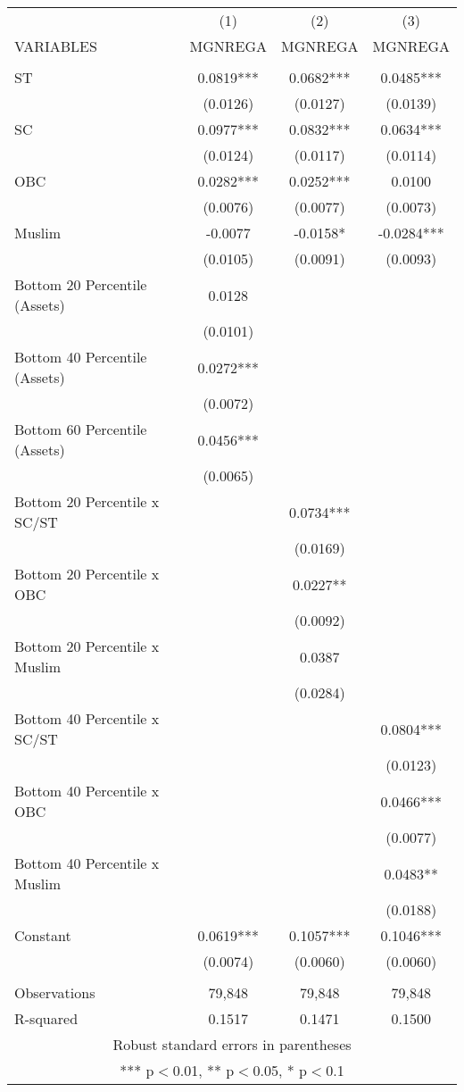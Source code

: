 \documentclass[]{article}
\begin{document}
\begin{tabular}{lccc} \hline
 & (1) & (2) & (3) \\
VARIABLES & MGNREGA & MGNREGA & MGNREGA \\ \hline
 &  &  &  \\
ST & 0.0819*** & 0.0682*** & 0.0485*** \\
 & (0.0126) & (0.0127) & (0.0139) \\
SC & 0.0977*** & 0.0832*** & 0.0634*** \\
 & (0.0124) & (0.0117) & (0.0114) \\
OBC & 0.0282*** & 0.0252*** & 0.0100 \\
 & (0.0076) & (0.0077) & (0.0073) \\
Muslim & -0.0077 & -0.0158* & -0.0284*** \\
 & (0.0105) & (0.0091) & (0.0093) \\
Bottom 20 Percentile (Assets) & 0.0128 &  &  \\
 & (0.0101) &  &  \\
Bottom 40 Percentile (Assets) & 0.0272*** &  &  \\
 & (0.0072) &  &  \\
Bottom 60 Percentile (Assets) & 0.0456*** &  &  \\
 & (0.0065) &  &  \\
Bottom 20 Percentile x SC/ST &  & 0.0734*** &  \\
 &  & (0.0169) &  \\
Bottom 20 Percentile x OBC &  & 0.0227** &  \\
 &  & (0.0092) &  \\
Bottom 20 Percentile x Muslim &  & 0.0387 &  \\
 &  & (0.0284) &  \\
Bottom 40 Percentile x SC/ST &  &  & 0.0804*** \\
 &  &  & (0.0123) \\
Bottom 40 Percentile x OBC &  &  & 0.0466*** \\
 &  &  & (0.0077) \\
Bottom 40 Percentile x Muslim &  &  & 0.0483** \\
 &  &  & (0.0188) \\
Constant & 0.0619*** & 0.1057*** & 0.1046*** \\
 & (0.0074) & (0.0060) & (0.0060) \\
 &  &  &  \\
Observations & 79,848 & 79,848 & 79,848 \\
 R-squared & 0.1517 & 0.1471 & 0.1500 \\ \hline
\multicolumn{4}{c}{ Robust standard errors in parentheses} \\
\multicolumn{4}{c}{ *** p$<$0.01, ** p$<$0.05, * p$<$0.1} \\
\end{tabular}
\end{document}
